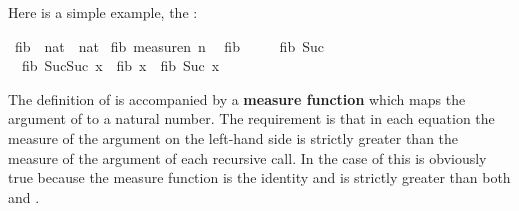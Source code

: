 %
\begin{isabellebody}%
\def\isabellecontext{examples}%
\isamarkupfalse%
%
\begin{isamarkuptext}%
Here is a simple example, the :%
\end{isamarkuptext}%
\isamarkuptrue%
\ fib\ {\isacharcolon}{\isacharcolon}\ {\isachardoublequote}nat\ {\isasymRightarrow}\ nat{\isachardoublequote}\isanewline
\isamarkupfalse%
\ fib\ {\isachardoublequote}measure{\isacharparenleft}{\isasymlambda}n{\isachardot}\ n{\isacharparenright}{\isachardoublequote}\isanewline
\ \ {\isachardoublequote}fib\ {}\ {\isacharequal}\ {}{\isachardoublequote}\isanewline
\ \ {\isachardoublequote}fib\ {\isacharparenleft}Suc\ {}{\isacharparenright}\ {\isacharequal}\ {}{\isachardoublequote}\isanewline
\ \ {\isachardoublequote}fib\ {\isacharparenleft}Suc{\isacharparenleft}Suc\ x{\isacharparenright}{\isacharparenright}\ {\isacharequal}\ fib\ x\ {\isacharplus}\ fib\ {\isacharparenleft}Suc\ x{\isacharparenright}{\isachardoublequote}\isamarkupfalse%
%
\begin{isamarkuptext}%
\noindent
{}%
The definition of  is accompanied by a \textbf{measure function}
 which maps the argument of  to a
natural number. The requirement is that in each equation the measure of the
argument on the left-hand side is strictly greater than the measure of the
argument of each recursive call. In the case of  this is
obviously true because the measure function is the identity and
 is strictly greater than both  and
.


\end{isamarkuptext}
\end{isabellebody}
